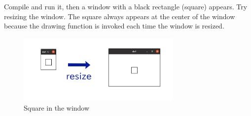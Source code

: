 Compile and run it, then a window with a black rectangle (square)
appears. Try resizing the window. The square always appears at the
center of the window because the drawing function is invoked each time
the window is resized.

\begin{figure}
\centering
\includegraphics[width=8cm,height=3.4cm]{../image/da1.png}
\caption{Square in the window}
\end{figure}
